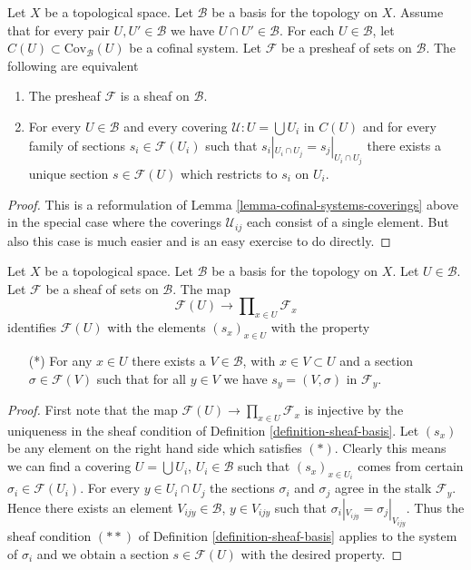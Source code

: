 \begin{lemma}
\label{lemma-cofinal-systems-coverings-standard-case}
Let $X$ be a topological space.
Let $\mathcal{B}$ be a basis for the topology on $X$.
Assume that for every pair $U, U' \in \mathcal{B}$
we have $U \cap U' \in \mathcal{B}$.
For each $U \in \mathcal{B}$, let $C(U) \subset \text{Cov}_\mathcal{B}(U)$
be a cofinal system.
Let $\mathcal{F}$ be a presheaf of sets on $\mathcal{B}$.
The following are equivalent
\begin{enumerate}
\item The presheaf $\mathcal{F}$ is a sheaf on $\mathcal{B}$.
\item For every $U \in \mathcal{B}$ and every covering
$\mathcal{U} : U = \bigcup U_i$ in $C(U)$ and for every
family of sections $s_i \in \mathcal{F}(U_i)$ such
that $s_i|_{U_i \cap U_j} = s_j|_{U_i \cap U_j}$ there
exists a unique section $s \in \mathcal{F}(U)$ which
restricts to $s_i$ on $U_i$.
\end{enumerate}
\end{lemma}

\begin{proof}
This is a reformulation of
Lemma \ref{lemma-cofinal-systems-coverings} above
in the special case where the coverings $\mathcal{U}_{ij}$
each consist of a single element. But also this case is much
easier and is an easy exercise to do directly.
\end{proof}

\begin{lemma}
\label{lemma-condition-star-sections}
Let $X$ be a topological space.
Let $\mathcal{B}$ be a basis for the topology on $X$.
Let $U \in \mathcal{B}$.
Let $\mathcal{F}$ be a sheaf of sets on $\mathcal{B}$.
The map
$$
\mathcal{F}(U) \to \prod\nolimits_{x \in U} \mathcal{F}_x
$$
identifies $\mathcal{F}(U)$ with the elements $(s_x)_{x\in U}$
with the property
\begin{itemize}
\item[(*)] For any $x \in U$ there exists a $V \in \mathcal{B}$,
with $x \in V \subset U$ and a section $\sigma \in \mathcal{F}(V)$
such that for all $y \in V$ we have $s_y = (V, \sigma)$ in $\mathcal{F}_y$.
\end{itemize}
\end{lemma}

\begin{proof}
First note that the map
$\mathcal{F}(U) \to \prod\nolimits_{x \in U} \mathcal{F}_x$
is injective by the uniqueness in the sheaf condition
of Definition \ref{definition-sheaf-basis}. Let $(s_x)$ be
any element on the right hand side which satisfies $(*)$.
Clearly this means we can find a covering $U = \bigcup U_i$,
$U_i \in \mathcal{B}$ such that $(s_x)_{x \in U_i}$ comes from
certain $\sigma_i \in \mathcal{F}(U_i)$. For every $y \in U_i \cap U_j$
the sections $\sigma_i$ and $\sigma_j$ agree in the stalk
$\mathcal{F}_y$. Hence there exists an element $V_{ijy} \in \mathcal{B}$,
$y \in V_{ijy}$ such that $\sigma_i|_{V_{ijy}} = \sigma_j|_{V_{ijy}}$.
Thus the sheaf condition $(**)$ of Definition \ref{definition-sheaf-basis}
applies to the system of $\sigma_i$ and we obtain a section
$s \in \mathcal{F}(U)$ with the desired property.
\end{proof}

